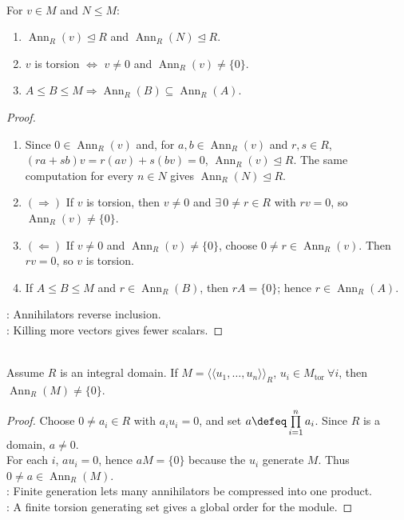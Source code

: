 \begin{proposition} \label{prop:annihilator-basic-properties} \\
For $v\in M$ and $N\leq M$:
\begin{enumerate}[label=(\roman*)]
\setlength{\itemsep}{0pt}
\item $\operatorname{Ann}_R(v)\trianglelefteq R$ and $\operatorname{Ann}_R(N)\trianglelefteq R$.
\item $v$ is torsion $\Longleftrightarrow$ $v\neq0$ and $\operatorname{Ann}_R(v)\neq\{0\}$.
\item $A\leq B\leq M \Longrightarrow \operatorname{Ann}_R(B)\subseteq\operatorname{Ann}_R(A)$.
\end{enumerate}
\begin{proof}
\begin{enumerate}[label=\roman*.]
\setlength{\itemsep}{0pt}
\item[$(i)$] Since $0\in\operatorname{Ann}_R(v)$ and, for $a,b\in\operatorname{Ann}_R(v)$ and $r,s\in R$, $(ra+sb)v=r(av)+s(bv)=0$, $\operatorname{Ann}_R(v)\trianglelefteq R$. The same computation for every $n\in N$ gives $\operatorname{Ann}_R(N)\trianglelefteq R$.
\item[$(ii)$]$(\Rightarrow)$ If $v$ is torsion, then $v\neq0$ and $\exists\,0\neq r\in R$ with $rv=0$, so $\operatorname{Ann}_R(v)\neq\{0\}$.
\item[$(ii)$]$(\Leftarrow)$ If $v\neq0$ and $\operatorname{Ann}_R(v)\neq\{0\}$, choose $0\neq r\in\operatorname{Ann}_R(v)$. Then $rv=0$, so $v$ is torsion.
\item[$(iii)$] If $A\leq B\leq M$ and $r\in\operatorname{Ann}_R(B)$, then $rA=\{0\}$; hence $r\in\operatorname{Ann}_R(A)$.
\end{enumerate}
: Annihilators reverse inclusion.\\
: Killing more vectors gives fewer scalars.
\end{proof}
\end{proposition}

\begin{proposition} \label{prop:finitely-generated-torsion-module-annihilator} \\
Assume $R$ is an integral domain. If $M=\langle\!\langle u_1,\ldots,u_n\rangle\!\rangle_R$, $u_i\in M_{\operatorname{tor}}\ \forall i$, then $\operatorname{Ann}_R(M)\neq\{0\}$.
\begin{proof}
Choose $0\neq a_i\in R$ with $a_iu_i=0$, and set $a\defeq\prod\limits_{i=1}^{n}a_i$. Since $R$ is a domain, $a\neq0$.\\
For each $i$, $au_i=0$, hence $aM=\{0\}$ because the $u_i$ generate $M$. Thus $0\neq a\in\operatorname{Ann}_R(M)$.\\
: Finite generation lets many annihilators be compressed into one product.\\
: A finite torsion generating set gives a global order for the module.
\end{proof}
\end{proposition}

